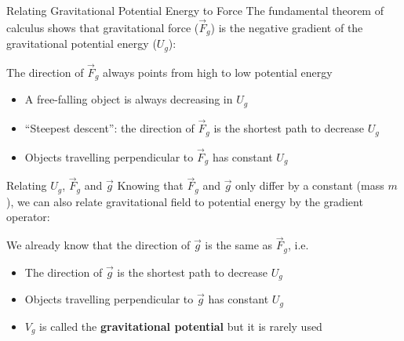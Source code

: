 \documentclass[12pt,compress,aspectratio=169]{beamer}
\begin{document}
\begin{frame}{Relating Gravitational Potential Energy to Force}
  The fundamental theorem of calculus shows that gravitational force
  ($\vec F_g$) is the negative gradient of the gravitational potential energy
  ($U_g$):
  

  The direction of $\vec F_g$ always points from high to low potential energy
  \begin{itemize}
  \item A free-falling object is always decreasing in $U_g$
  \item ``Steepest descent'': the direction of $\vec F_g$ is the shortest path
    to decrease $U_g$ 
  \item Objects travelling perpendicular to $\vec F_g$ has constant $U_g$
  \end{itemize}
\end{frame}



\begin{frame}{Relating $U_g$, $\vec F_g$ and $\vec g$}
  Knowing that $\vec F_g$ and $\vec g$ only differ by a constant (mass $m$), we
  can also relate gravitational field to potential energy by the gradient
  operator:


  We already know that the direction of $\vec g$ is the same as $\vec F_g$,
  i.e.
  \begin{itemize}
  \item The direction of $\vec g$ is the shortest path to decrease $U_g$ 
  \item Objects travelling perpendicular to $\vec g$ has constant $U_g$
  \item $V_g$ is called the \textbf{gravitational potential} but
    it is rarely used
  \end{itemize}
\end{frame}
\end{document}
